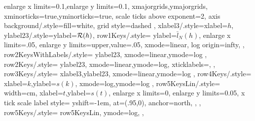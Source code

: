 {{{              enlarge x limits=0.1,enlarge y limits=0.1,
              xmajorgrids,ymajorgrids,
              xminorticks=true,yminorticks=true,
              scale ticks above exponent=2,
              axis background/.style={fill=white},
              grid style={dashed}
            },
            xlabel3/.style={xlabel={\(h\)}},
            ylabel23/.style={ylabel={\(\operatorname{\mathcal R}(h)\)}},
            row1Keys/.style={
              ylabel={\(\bar l_N(h)\)},
              enlarge x limits=.05,
              enlarge y limits={upper,value=.05},
              xmode=linear,
              log origin=infty,
            },
            row2KeysWithLabels/.style={
              ylabel23,
              xmode=linear,ymode=log
            },
            row2Keys/.style={
              ylabel23,
              xmode=linear,ymode=log,
              xticklabels={},
            },
            row3Keys/.style={
              xlabel3,ylabel23,
              xmode=linear,ymode=log
            },
            row4Keys/.style={
              xlabel={\(k\)},ylabel={\(s(k)\)},
              xmode=log,ymode=log
            },
            row5KeysLin/.style={
              width=\plotLastWidth cm,
              xlabel={\(t\)},ylabel={\(s(t)\)},
              enlarge x limits=0,
              enlarge y limits=0.05,
              x tick scale label style={
                yshift=-1em,
                at={(.95,0)},
                anchor=north,
              },
            },
            row5Keys/.style={
              row5KeysLin,
              ymode=log,
            },
          }
      }
  
